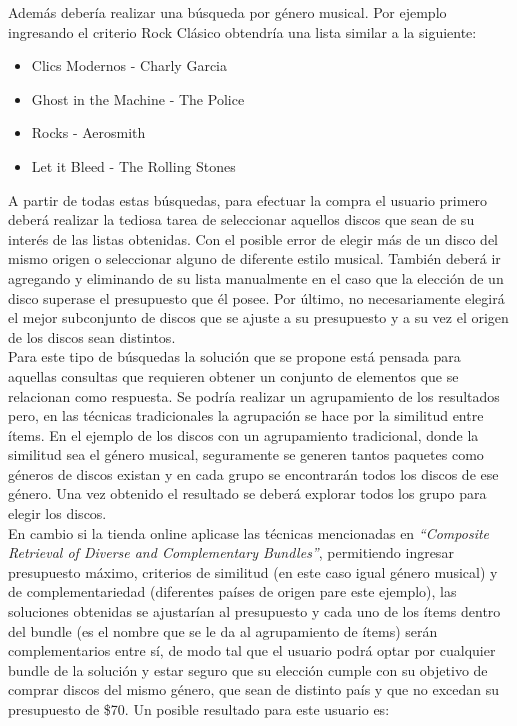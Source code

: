 Además debería realizar una búsqueda por género musical. Por ejemplo ingresando el criterio Rock Clásico obtendría una lista similar a la siguiente:
\begin{itemize}
	\item Clics Modernos - Charly Garcia
	\item Ghost in the Machine - The Police
	\item Rocks - Aerosmith
	\item Let it Bleed - The Rolling Stones
\end{itemize}

A partir de todas estas búsquedas, para efectuar la compra el usuario primero deberá realizar la tediosa tarea de seleccionar aquellos discos que sean de su interés de las listas obtenidas. Con el posible error de elegir más de un disco del mismo origen o seleccionar alguno de diferente estilo musical. También deberá ir agregando y eliminando de su lista manualmente en el caso que la elección de un disco superase el presupuesto que él posee. Por último, no necesariamente elegirá el mejor subconjunto de discos que se ajuste a su presupuesto y a su vez el origen de los discos sean distintos.\\
Para este tipo de búsquedas la solución que se propone está pensada para aquellas consultas que requieren obtener un conjunto de elementos que se relacionan como respuesta. Se podría realizar un agrupamiento de los resultados pero, en las técnicas tradicionales la agrupación se hace por la similitud entre ítems. En el ejemplo de los discos con un agrupamiento tradicional, donde la similitud sea el género musical, seguramente se generen tantos paquetes como géneros de discos existan y en cada grupo se encontrarán todos los discos de ese género. Una vez obtenido el resultado se deberá explorar todos los grupo para elegir los discos.\\
En cambio si la tienda online aplicase las técnicas mencionadas en \textit{``Composite Retrieval of Diverse and Complementary Bundles''}, permitiendo ingresar presupuesto máximo, criterios de similitud (en este caso igual género musical) y de complementariedad (diferentes países de origen pare este ejemplo), las soluciones obtenidas se ajustarían al presupuesto y cada uno de los ítems dentro del bundle (es el nombre que se le da al agrupamiento de ítems) serán complementarios entre sí, de modo tal que el usuario podrá optar por cualquier bundle de la solución y estar seguro que su elección cumple con su objetivo de comprar discos del mismo género, que sean de distinto país y que no excedan su presupuesto de \$70. Un posible resultado para este usuario es:
